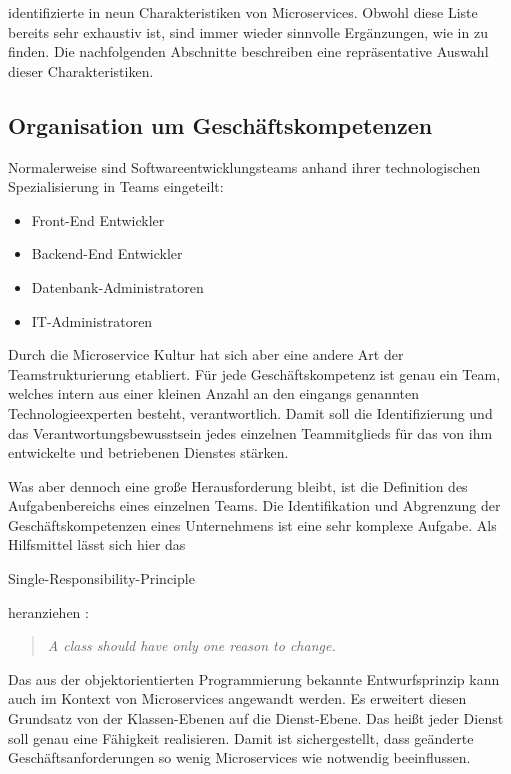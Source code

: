 \citeauthor{FowlerMS} identifizierte in \cite{FowlerMS} neun Charakteristiken von Microservices. Obwohl diese Liste bereits sehr exhaustiv ist, sind immer wieder sinnvolle Ergänzungen, wie in \cite{HorsdalMS} zu finden. Die nachfolgenden Abschnitte beschreiben eine repräsentative Auswahl dieser Charakteristiken.

\subsection{Organisation um Geschäftskompetenzen}

Normalerweise sind Softwareentwicklungsteams anhand ihrer technologischen Spezialisierung in Teams eingeteilt:

\begin{itemize}
	\item Front-End Entwickler
	\item Backend-End Entwickler
	\item Datenbank-Administratoren
	\item IT-Administratoren
\end{itemize}

Durch die Microservice Kultur hat sich aber eine andere Art der Teamstrukturierung etabliert. Für jede Geschäftskompetenz ist genau ein Team, welches intern aus einer kleinen Anzahl an den eingangs genannten Technologieexperten besteht, verantwortlich. Damit soll die Identifizierung und das Verantwortungsbewusstsein jedes einzelnen Teammitglieds für das von ihm entwickelte und betriebenen Dienstes stärken.

Was aber dennoch eine große Herausforderung bleibt, ist die Definition des Aufgabenbereichs eines einzelnen Teams. Die Identifikation und Abgrenzung der Geschäftskompetenzen eines Unternehmens ist eine sehr komplexe Aufgabe. Als Hilfsmittel lässt sich hier das \begin{english} Single-Responsibility-Principle\end{english} heranziehen \cite{MartinAgile}: 

\begin{english}
\begin{quote}
  \textit{A class should have only one reason to change.}
\end{quote}
\end{english}

Das aus der objektorientierten Programmierung bekannte Entwurfsprinzip kann auch im Kontext von Microservices angewandt werden. Es erweitert diesen Grundsatz von der Klassen-Ebenen auf die Dienst-Ebene. Das heißt jeder Dienst soll genau eine Fähigkeit realisieren. Damit ist sichergestellt, dass geänderte Geschäftsanforderungen so wenig Microservices wie notwendig beeinflussen.

